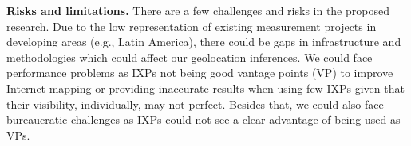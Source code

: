 	\textbf{Risks and limitations.} There are a few challenges and risks in the proposed research. Due to the low representation of existing measurement projects in developing areas (e.g., Latin America), there could be gaps in infrastructure and methodologies which could affect our geolocation inferences. We could face performance problems as IXPs not being good vantage points (VP) to improve Internet mapping or providing inaccurate results when using few IXPs given that their visibility, individually, may not perfect. Besides that, we could also face bureaucratic challenges as IXPs could not see a clear advantage of being used as VPs.

